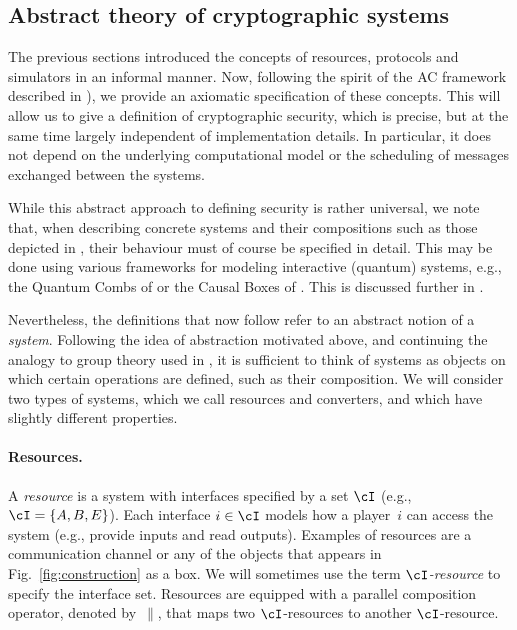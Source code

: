 \subsection{Abstract theory of cryptographic systems}
\label{sec:ac.systems}

The previous sections introduced the concepts of resources, protocols
and simulators in an informal manner. Now, following the spirit of the
AC framework described in ), we provide an axiomatic specification of these
concepts. This will allow us to give a definition of cryptographic security, which is precise, but at the same time largely independent of
implementation details. In particular, it does not depend on the underlying computational model or the scheduling of messages exchanged between the systems. 

While this abstract approach to defining security is rather universal, we note that, when describing concrete systems and
their compositions such as those 
depicted in , their behaviour must of course be
specified in detail. This may be done using various
frameworks for modeling interactive (quantum) systems, e.g., the
Quantum Combs of \textcite{CDP09} or the Causal Boxes of
\textcite{PMMRT17}. This is discussed further in
.

Nevertheless, the definitions that now follow refer to an abstract notion of a \emph{system}. Following the idea of abstraction motivated above, and  continuing the analogy to group theory used in , it is sufficient to think of systems as objects on which certain operations are defined, such as their composition.  We will consider two types of systems, which we call resources and converters, and which have slightly different properties.

\paragraph{Resources.} A \emph{resource} is a system with
interfaces specified by a set $\cI$ (e.g., $\cI = \{A,B,E\}$).  
Each
interface $i \in \cI$ models how a player~$i$ can access the system
(e.g., provide inputs and read outputs). Examples of resources are a communication channel or any of the objects that appears in Fig.~\ref{fig:construction} as a box. We will sometimes use the term \emph{$\cI$-resource} to specify the interface set. Resources are equipped with
a parallel composition operator, denoted by~$\|$, that maps two $\cI$-resources to
another $\cI$-resource.

